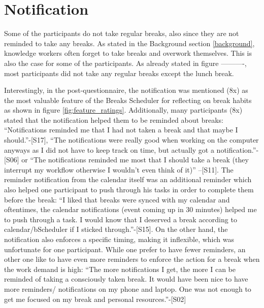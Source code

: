 \documentclass{hasel_thesis}
\begin{document}
\section{Notification} \label{notification}

Some of the participants do not take regular breaks, also since they are not reminded to take any breaks. As stated in the Background section \ref{background}, knowledge workers often forget to take breaks and overwork themselves. This is also the case for some of the participants. As already stated in figure ----------, most participants did not take any regular breaks except the lunch break.

Interestingly, in the post-questionnaire, the notification was mentioned (8x) as the most valuable feature of the Breaks Scheduler for reflecting on break habits as shown in figure \ref{fig:feature_ratings}. Additionally, many participants (8x) stated that the notification helped them to be reminded about breaks: “Notifications reminded me that I had not taken a break and that maybe I should.”-[S17], “The notifications were really good when working on the computer anyways as I did not have to keep track on time, but actually got a notification.”-[S06] or “The notifications reminded me most that I should take a break (they interrupt my workflow otherwise I wouldn't even think of it)” –[S11]. The reminder notification from the calendar itself was an additional reminder which also helped one participant to push through his tasks in order to complete them before the break: “I liked that breaks were synced with my calendar and oftentimes, the calendar notifications (event coming up in 30 minutes) helped me to push through a task. I would know that I deserved a break according to calendar/bScheduler if I sticked through.”-[S15]. On the other hand, the notification also enforces a specific timing, making it inflexible, which was unfortunate for one participant. While one prefer to have fewer reminders, an other one like to have even more reminders to enforce the action for a break when the work demand is high: “The more notifications I get, the more I can be reminded of taking a consciously taken break. It would have been nice to have more reminders/ notifications on my phone and laptop. One was not enough to get me focused on my break and personal resources.”-[S02]
\end{document}
